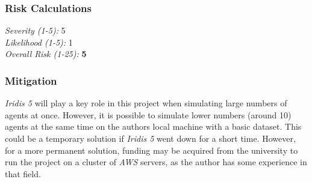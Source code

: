 \subsubsection{Risk Calculations}
\emph{Severity (1-5):} 5 \\
\emph{Likelihood (1-5):} 1 \\
\emph{Overall Risk (1-25):} \textbf{5}
\subsubsection{Mitigation}
\emph{Iridis 5} will play a key role in this project when simulating large numbers of agents at once. However, it is possible to simulate lower numbers (around 10) agents at the same time on the authors local machine with a basic dataset. This could be a temporary solution if \emph{Iridis 5} went down for a short time. However, for a more permanent solution, funding may be acquired from the university to run the project on a cluster of \emph{AWS} servers, as the author has some experience in that field. 